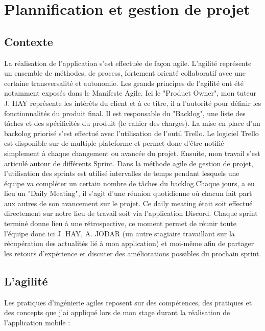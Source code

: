 \chapter{Plannification et gestion de projet}
\label{sec:Plannification et gestion de projet}

\section{Contexte}

La réalisation de l'application s'est effectuée de façon agile. L'agilité représente un ensemble de méthodes, de process, fortement orienté collaboratif avec une certaine transversalité et autonomie. Les grands principes de l'agilité ont été notamment exposés dans le Manifeste Agile. Ici le "Product Owner", mon tuteur J. HAY représente les intérêts du client et à ce titre, il a l’autorité pour définir les fonctionnalités du produit final. Il est responsable du "Backlog", une liste des tâches et des spécificités du produit (le cahier des charges). La mise en place d'un backolog priorisé s'est effectué avec l'utilisation de l'outil Trello. Le logiciel Trello est disponible sur de multiple plateforme et permet donc d'être notifié simplement à chaque changement ou avancée du projet. Ensuite, mon travail s'est articulé autour de différents Sprint. Dans la méthode agile de gestion de projet, l'utilisation des sprints est utilisé intervalles de temps pendant lesquels une équipe va compléter un certain nombre de tâches du backlog.Chaque  jours, a eu lieu un "Daily Meating", il s'agit d'une réunion quotidienne où chacun fait part aux autres de son avancement sur le projet. Ce daily meating était soit effectué directement sur notre lieu de travail soit via l’application Discord. Chaque sprint terminé donne lieu à une rétrospective, ce moment permet de réunir toute l’équipe donc ici J. HAY, A. JODAR (un autre stagiaire travaillant sur la récupération des actualités lié à mon application) et moi-même afin de partager les retours d’expérience et discuter des améliorations possibles du prochain sprint.

\section{L’agilité}
Les pratiques d’ingénierie agiles reposent sur des compétences, des pratiques et des concepts que j’ai appliqué lors de mon stage durant la réalisation de l’application mobile :

